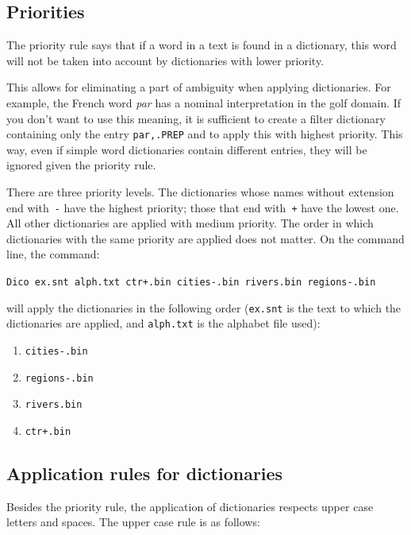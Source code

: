 \subsection{Priorities}
\label{section-dictionary-priorities}
The priority rule says that  if a word in a text is found in a dictionary, this
word will not be taken into account by dictionaries with lower priority.

\bigskip
\noindent This allows for eliminating a part of ambiguity when applying
dictionaries. For example, the French word \textit{par} has a nominal interpretation in the golf
domain. If you don't want to use this meaning, it is sufficient to create a
filter dictionary containing only the entry \verb$par,.PREP$ and to apply this
with highest priority. This way, even if simple word dictionaries contain 
different entries, they will be ignored given the priority rule.

\bigskip
\noindent There are three priority levels. The dictionaries whose names without
extension end with~\verb+-+
\index{\verb+-+}\index{\verb-+-}
have the highest priority; those that end with~\verb-+- have the lowest one.
All other dictionaries are applied with medium priority. The order in which
dictionaries with the same priority are applied does not matter.
On the command line, the command:

\bigskip
\noindent
\verb$Dico ex.snt alph.txt ctr+.bin cities-.bin rivers.bin regions-.bin$

\bigskip \noindent will apply the dictionaries in the following order
(\verb+ex.snt+ is the text to which the dictionaries are applied, and 
\verb+alph.txt+ is the alphabet file used):

\bigskip
\begin{enumerate}
  \item \verb$cities-.bin$
  \item \verb$regions-.bin$
  \item \verb$rivers.bin$
  \item \verb$ctr+.bin$
\end{enumerate}

\subsection{Application rules for dictionaries}
\label{section-transducer-application-rules}

Besides the priority rule, the application of dictionaries respects  upper  case
letters and spaces. The upper case rule is as follows:

